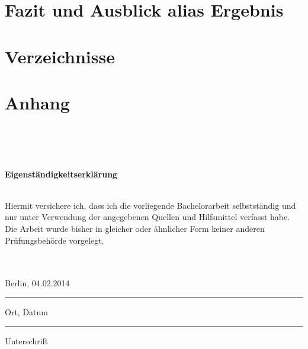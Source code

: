 \documentclass[a4paper,11pt,oneside,%
headsepline,												%
footsepline,												%
bibtotocnumbered									%
]{scrreprt}
\begin{document}
\chapter{Fazit und Ausblick alias Ergebnis}


\newpage
\listoftodos[Notes]

\newpage
\printbibheading
\printbibliography[type=book,heading=subbibliography,title={Buch Quellen}]
\printbibliography[nottype=book,heading=subbibliography,title={Andere Quellen}]

\chapter{Verzeichnisse}

\chapter{Anhang}

\newpage

\hfil\\\\\\

\begin{LARGE}
\textbf{Eigenständigkeitserklärung}\\\\
\end{LARGE} 
Hiermit versichere ich, dass ich die vorliegende Bachelorarbeit selbstständig und nur
unter Verwendung der angegebenen Quellen und Hilfsmittel verfasst habe. Die Arbeit
wurde bisher in gleicher oder ähnlicher Form keiner anderen Prüfungsbehörde vorgelegt.\\\\\\

\parbox{4cm}{\centering Berlin, 04.02.2014\hrule
\strut \centering\footnotesize Ort, Datum} \hfill\parbox{4cm}{\hrule
\strut \centering\footnotesize Unterschrift}
\end{document}
